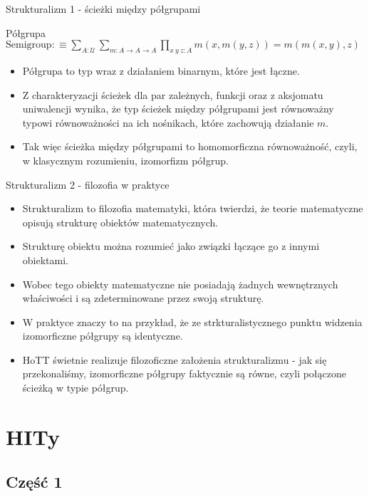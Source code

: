 \documentclass{beamer}
\newcommand{\defn}{:\equiv}
\newcommand{\U}{\mathcal{U}}
\begin{document}
\begin{frame}{Strukturalizm 1 - ścieżki między półgrupami}

\begin{block}{Półgrupa}
$\displaystyle \text{Semigroup} \defn \sum_{A : \U} \sum_{m : A \to A \to A} \prod_{x\ y\ z : A} m(x, m(y, z)) = m(m(x, y), z)$
\end{block}

\begin{itemize}
	\item Półgrupa to typ wraz z działaniem binarnym, które jest łączne.
	\item Z charakteryzacji ścieżek dla par zależnych, funkcji oraz z aksjomatu uniwalencji wynika, że typ ścieżek między półgrupami jest równoważny typowi równoważności na ich nośnikach, które zachowują działanie $m$.
	\item Tak więc ścieżka między półgrupami to homomorficzna równoważność, czyli, w klasycznym rozumieniu, izomorfizm półgrup.
\end{itemize}

\end{frame}

\begin{frame}{Strukturalizm 2 - filozofia w praktyce}
\begin{itemize}
	\item Strukturalizm to filozofia matematyki, która twierdzi, że teorie matematyczne opisują strukturę obiektów matematycznych.
	\item Strukturę obiektu można rozumieć jako związki łączące go z innymi obiektami.
	\item Wobec tego obiekty matematyczne nie posiadają żadnych wewnętrznych właściwości i są zdeterminowane przez swoją strukturę.
	\item W praktyce znaczy to na przykład, że ze strkturalistycznego punktu widzenia izomorficzne półgrupy są identyczne.
	\item HoTT świetnie realizuje filozoficzne założenia strukturalizmu - jak się przekonaliśmy, izomorficzne półgrupy faktycznie są równe, czyli połączone ścieżką w typie półgrup.
\end{itemize}

\end{frame}

\section{HITy}

\subsection{Część 1}
\end{document}
